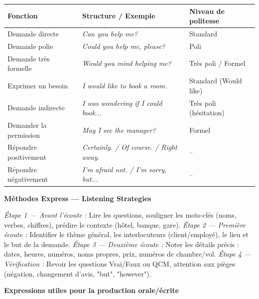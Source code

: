 \documentclass[11pt]{article}
\newcommand{\cle}[1]{{\popxbold\color{popdark}#1}}
\newcommand{\eng}[1]{\ifmmode\text{\textit{#1}}\else\begingroup\selectlanguage{english}\itshape #1\endgroup\fi}
\begin{document}
\begin{bilan}
\begin{center}
\begin{tabularx}{\linewidth}{|X|X|X|}
\hline
\rowcolor{poporangeL} \textbf{Fonction} & \textbf{Structure / Exemple} & \textbf{Niveau de politesse} \\
\hline
Demande directe & \eng{Can you help me?} & Standard \\
Demande polie & \eng{Could you help me, please?} & Poli \\
Demande très formelle & \eng{Would you mind helping me?} & Très poli / Formel \\
Exprimer un besoin & \eng{I would like to book a room.} & Standard (Would like) \\
Demande indirecte & \eng{I was wondering if I could book...} & Très poli (hésitation) \\
Demander la permission & \eng{May I see the manager?} & Formel \\
Répondre positivement & \eng{Certainly. / Of course. / Right away.} & -- \\
Répondre négativement & \eng{I'm afraid not. / I'm sorry, but...} & -- \\
\hline
\end{tabularx}
\end{center}

\vspace{0.5cm}

\textbf{Méthodes Express — Listening Strategies}

\end{bilan}

\begin{methode}
\emph{Étape 1 — Avant l'écoute :} Lire les questions, souligner les \cle{mots-clés} (noms, verbes, chiffres), prédire le contexte (hôtel, banque, gare).
\emph{Étape 2 — Première écoute :} Identifier le \cle{thème général}, les \cle{interlocuteurs} (client/employé), le \cle{lieu} et le \cle{but} de la demande.
\emph{Étape 3 — Deuxième écoute :} Noter les \cle{détails précis} : dates, heures, numéros, noms propres, prix, numéros de chambre/vol.
\emph{Étape 4 — Vérification :} Revoir les questions Vrai/Faux ou QCM, attention aux \cle{pièges} (négation, changement d'avis, "but", "however").
\end{methode}

\vspace{0.5cm}

\textbf{Expressions utiles pour la production orale/écrite}
\end{document}
